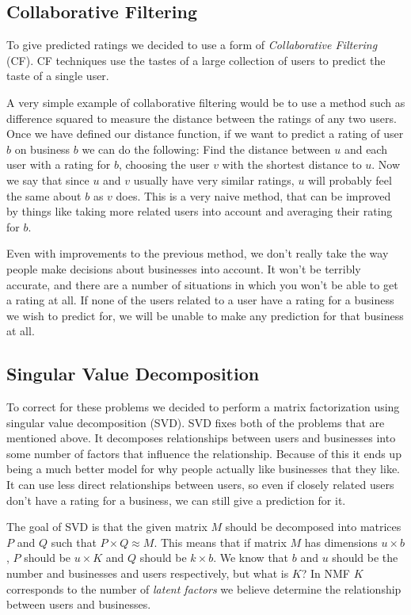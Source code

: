 \subsection{Collaborative Filtering}

To give predicted ratings we decided to use a form of \emph{Collaborative
Filtering} (CF). CF techniques use the tastes of a large collection of users to
predict the taste of a single user.

A very simple example of collaborative filtering would be to use a method such
as difference squared to measure the distance between the ratings of any two
users. Once we have defined our distance function, if we want to predict a
rating of user $b$ on business $b$ we can do the following: Find the distance
between $u$ and each user with a rating for $b$, choosing the user $v$ with the
shortest distance to $u$. Now we say that since $u$ and $v$ usually have very
similar ratings, $u$ will probably feel the same about $b$ as $v$ does. This is
a very naive method, that can be improved by things like taking more related
users into account and averaging their rating for $b$.

Even with improvements to the previous method, we don't really take the way
people make decisions about businesses into account. It won't be terribly
accurate, and there are a number of situations in which you won't be able to get
a rating at all. If none of the users related to a user have a rating for a
business we wish to predict for, we will be unable to make any prediction for
that business at all. 

\subsection{Singular Value Decomposition}
To correct for these problems we decided to perform a matrix factorization
using singular value decomposition (SVD). SVD fixes both of the problems that
are mentioned above. It decomposes relationships between users and businesses
into some number of factors that influence the relationship. Because of this it
ends up being a much better model for why people actually like businesses that
they like. It can use less direct relationships between users, so even if
closely related users don't have a rating for a business, we can still give a
prediction for it. 

The goal of SVD is that the given matrix $M$ should be decomposed into
matrices $P$ and $Q$ such that $P \times Q \approx M $. This means that if
matrix $M$ has dimensions $u \times b$, $P$ should be $u \times K$ and $Q$
should be $k \times b$. We know that $b$ and $u$ should be the number and
businesses and users respectively, but what is $K$? In NMF $K$ corresponds to
the number of \emph{latent factors} we believe determine the relationship
between users and businesses.

